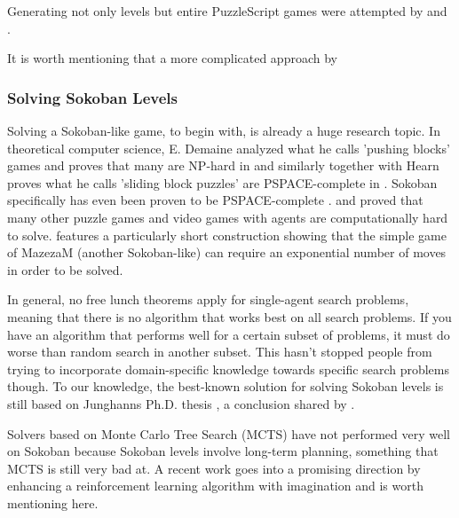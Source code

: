 Generating not only levels but entire PuzzleScript games were attempted by \cite{Khalifa2015} and \cite{Lim2014}. 

It is worth mentioning that a more complicated approach by 

\subsubsection{Solving Sokoban Levels}

Solving a Sokoban-like game, to begin with, is already a huge research topic. In theoretical computer science, E. Demaine analyzed what he calls 'pushing blocks' games and proves that many are NP-hard in \cite{Demaine2003} and similarly together with Hearn proves what he calls 'sliding block puzzles' are PSPACE-complete in \cite{Hearn2005}. Sokoban specifically has even been proven to be PSPACE-complete \cite{Culberson1997}. \cite{Viglietta2014} and \cite{Hard2015} proved that many other puzzle games and video games with agents are computationally hard to solve. \cite{Williams2017} features a particularly short construction showing that the simple game of MazezaM (another Sokoban-like) can require an exponential number of moves in order to be solved. %

In general, no free lunch theorems apply for single-agent search problems, meaning that there is no algorithm that works best on all search problems. If you have an algorithm that performs well for a certain subset of problems, it must do worse than random search in another subset. This hasn't stopped people from trying to incorporate domain-specific knowledge towards specific search problems though. To our knowledge, the best-known solution for solving Sokoban levels is still based on Junghanns Ph.D. thesis \cite{Junghanns1999}, a conclusion shared by \cite{Froleyks2016}.

Solvers based on Monte Carlo Tree Search (MCTS) have not performed very well on Sokoban because Sokoban levels involve long-term planning, something that MCTS is still very bad at. A recent work \cite{Weber2017} goes into a promising direction by enhancing a reinforcement learning algorithm with imagination and is worth mentioning here.


